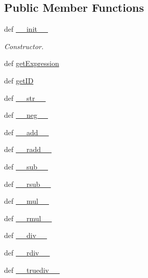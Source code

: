 \subsection*{Public Member Functions}
\begin{DoxyCompactItemize}
\item 
def \hyperlink{classbio__expression_1_1_expression_a9a50cf1329f421dd4c6cee497853f18d}{\+\_\+\+\_\+init\+\_\+\+\_\+}
\begin{DoxyCompactList}\small\item\em Constructor. \end{DoxyCompactList}\item 
def \hyperlink{classbio__expression_1_1_expression_a5abe6ae1fffd64879b6fb24f1ff3b357}{get\+Expression}
\item 
def \hyperlink{classbio__expression_1_1_expression_a9d1b24fd8662ac1377c57e32d6f67a54}{get\+I\+D}
\item 
def \hyperlink{classbio__expression_1_1_expression_a940b1a03c3cb4c0efa834f8870392dcd}{\+\_\+\+\_\+str\+\_\+\+\_\+}
\item 
def \hyperlink{classbio__expression_1_1_expression_a429ba4eb1223985c397d3403ff7d868d}{\+\_\+\+\_\+neg\+\_\+\+\_\+}
\item 
def \hyperlink{classbio__expression_1_1_expression_aab1d9d94faf502f88162f53ed78a3ee0}{\+\_\+\+\_\+add\+\_\+\+\_\+}
\item 
def \hyperlink{classbio__expression_1_1_expression_a95e8fd173e3f5c022761c3968f00105a}{\+\_\+\+\_\+radd\+\_\+\+\_\+}
\item 
def \hyperlink{classbio__expression_1_1_expression_aa21f35795b349927552d09df41604b6a}{\+\_\+\+\_\+sub\+\_\+\+\_\+}
\item 
def \hyperlink{classbio__expression_1_1_expression_a05c7edeb980c551299f608af800e8c9e}{\+\_\+\+\_\+rsub\+\_\+\+\_\+}
\item 
def \hyperlink{classbio__expression_1_1_expression_aa3c9af65206e1de62338fde6d211afb0}{\+\_\+\+\_\+mul\+\_\+\+\_\+}
\item 
def \hyperlink{classbio__expression_1_1_expression_aedd1b034b207c06886872a2224b7d2c0}{\+\_\+\+\_\+rmul\+\_\+\+\_\+}
\item 
def \hyperlink{classbio__expression_1_1_expression_a4a422ee15e6fbdab0df85b7f2befc7d6}{\+\_\+\+\_\+div\+\_\+\+\_\+}
\item 
def \hyperlink{classbio__expression_1_1_expression_af807ce024c0af53ea36c1632ab82fb3c}{\+\_\+\+\_\+rdiv\+\_\+\+\_\+}
\item 
def \hyperlink{classbio__expression_1_1_expression_a1aaeb7f3e58914f1107a356cb6dd5332}{\+\_\+\+\_\+truediv\+\_\+\+\_\+}

\end{DoxyCompactItemize}
